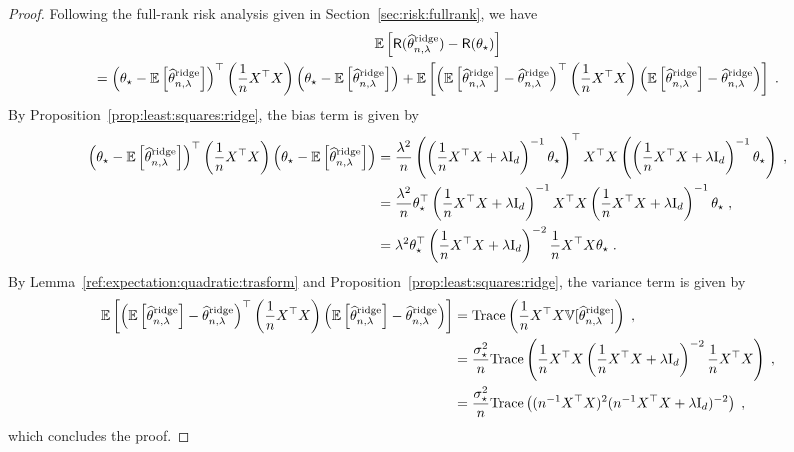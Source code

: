 \begin{proof}
Following the full-rank risk analysis given in Section~\ref{sec:risk:fullrank}, we have
\begin{multline*}
\mathbb{E}\left[\mathsf{R}(\widehat {\theta}^{\mathrm{ridge}}_{n,\lambda}) - \mathsf{R}(\theta_\star)\right] \\
=\left(\theta_\star-\mathbb{E}\left[\widehat {\theta}^{\mathrm{ridge}}_{n,\lambda}\right]\right)^\top \left(\frac{1}{n}X^\top X\right) \left(\theta_\star-\mathbb{E}\left[\widehat {\theta}^{\mathrm{ridge}}_{n,\lambda}\right] \right) + \mathbb{E}\left[ \left(\mathbb{E}\left[\widehat {\theta}^{\mathrm{ridge}}_{n,\lambda}\right] - \widehat {\theta}^{\mathrm{ridge}}_{n,\lambda}\right)^\top \left(\frac{1}{n}X^\top X\right) \left(\mathbb{E}\left[\widehat {\theta}^{\mathrm{ridge}}_{n,\lambda}\right] - \widehat {\theta}^{\mathrm{ridge}}_{n,\lambda}\right)\right]\;.
\end{multline*}
By Proposition~\ref{prop:least:squares:ridge}, the bias term is given by
\begin{align*}
\left(\theta_\star-\mathbb{E}\left[\widehat {\theta}^{\mathrm{ridge}}_{n,\lambda}\right]\right)^\top \left(\frac{1}{n}X^\top X\right) \left(\theta_\star-\mathbb{E}\left[\widehat {\theta}^{\mathrm{ridge}}_{n,\lambda}\right] \right) &= \frac{\lambda^2}{n}\left(\left(\frac{1}{n}X^\top X + \lambda \mathrm{I}_d\right)^{-1}\theta_\star\right)^\top X^\top X  \left(\left(\frac{1}{n}X^\top X + \lambda \mathrm{I}_d\right)^{-1}\theta_\star\right)\;,\\
&= \frac{\lambda^2}{n}\theta_\star^\top\left(\frac{1}{n}X^\top X + \lambda \mathrm{I}_d\right)^{-1} X^\top X \left(\frac{1}{n}X^\top X + \lambda \mathrm{I}_d\right)^{-1}\theta_\star\;,\\
&= \lambda^2\theta_\star^\top\left(\frac{1}{n}X^\top X + \lambda \mathrm{I}_d\right)^{-2} \frac{1}{n}X^\top X \theta_\star\;.
\end{align*}
By Lemma~\ref{ref:expectation:quadratic:trasform} and  Proposition~\ref{prop:least:squares:ridge}, the variance term is given by
\begin{align*}
\mathbb{E}\left[ \left(\mathbb{E}\left[\widehat {\theta}^{\mathrm{ridge}}_{n,\lambda}\right] - \widehat {\theta}^{\mathrm{ridge}}_{n,\lambda}\right)^\top \left(\frac{1}{n}X^\top X\right) \left(\mathbb{E}\left[\widehat {\theta}^{\mathrm{ridge}}_{n,\lambda}\right] - \widehat {\theta}^{\mathrm{ridge}}_{n,\lambda}\right)\right] &= \mathrm{Trace}\left(\frac{1}{n}X^\top X \mathbb{V}[\widehat {\theta}^{\mathrm{ridge}}_{n,\lambda}]\right)\;,\\
&= \frac{\sigma_\star^{2}}{n}\mathrm{Trace}\left(\frac{1}{n}X^\top X\left(\frac{1}{n}X^\top X + \lambda \mathrm{I}_d\right)^{-2}\frac{1}{n}X^\top X\right)\;,\\
&= \frac{\sigma_\star^{2}}{n}\mathrm{Trace}\left((n^{-1}X^\top X)^2(n^{-1}X^\top X + \lambda \mathrm{I}_d)^{-2}\right)\;,
\end{align*}
which concludes the proof.
\end{proof}
